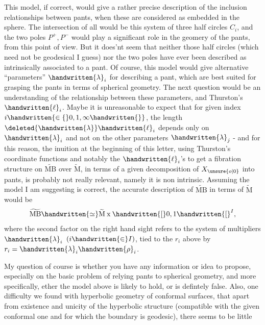 This model, if correct, would give a rather precise description of the inclusion relationships between pants, when these are considered as embedded in the sphere. The intersection of all would be this system of three half circles $C_i$, and the two poles $P^+,P^-$ would play a significant role in the geomery of the pants, from this point of view. But it does'nt seem that neither those half circles (which need not be geodesical I guess)\handwritten{,} nor the two poles\handwritten{,} have ever been described as intrinsically associated to a pant. Of course, this model would give alternative ``parameters'' $\handwritten{\lambda}_i$ for describing a pant, which are best suited for grasping the pants in terms of spherical geometry. The next question would be an understanding of the relationship between these parameters, and Thurston's $\handwritten{\ell}_i$. Maybe it is unreasonable to expect that for given index $i\handwritten{\in\{}0,1,\infty\handwritten{\}}$, the length $\deleted{\handwritten{\lambda}}\handwritten{\ell}_i$ depends only on $\handwritten{\lambda}_i$ and not on the other parameters $\handwritten{\lambda}_j$ - and for this reason,  the inuition at the beginning of this letter, using Thurston's coordinate functions and notably the $\handwritten{\ell}_i$'s to get a fibration structure on $\widetilde{\mathrm{MB}}$ over $\widetilde{\mathrm M}$, in terms of a given decomposition of $X_{\unsure{o|0}}$ into pants, is probably not really relevant, namely it is non intrinsic. Assuming the model I am suggesting is correct, the accurate description  of $\widetilde{\mathrm{MB}}$ in terms of $\widetilde{\mathrm M}$ would be
\[
\widetilde{\mathrm{MB}}\handwritten{\simeq}\widetilde{\mathrm M}\mathbin{\mathrm{x}}\handwritten{[}0,1\handwritten{[}^{I},
\]
where the second factor on the right hand sight refers to the system of multipliers $\handwritten{\lambda}_i$ $(i\handwritten{\in} I)$, tied to the $r_i$ above by $r_i=\handwritten{\lambda}_i\handwritten{\rho}_i$.

My question of course is whether you have any information or idea to propose, especially on the basic problem of relying pants to spherical geometry, and more specifically, ether the model above is likely to hold, or is defintely false. Also, one difficulty we found with hyperbolic geometry of conformal surfaces,  that apart from existence and unicity of the hyperbolic structure (compatible with the given conformal one and for which the boundary is geodesic), there seems to be little

